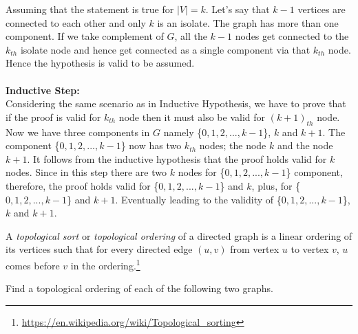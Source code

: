 \documentclass[addpoints]{exam}
\begin{document}
\begin{questions}
\begin{solution}
	Assuming that the statement is true for $\left|V\right|=k$. Let's say that $k-1$ vertices are connected to each other and only $k$ is an isolate. The graph has more than one component. If we take complement of $G$, all the $k-1$ nodes get connected to the $k_{th}$ isolate node and hence get connected as a single component via that $k_{th}$ node. Hence the hypothesis is valid to be assumed. \\ \\
	\textbf{Inductive Step:}\\
	Considering the same scenario as in Inductive Hypothesis, we have to prove that if the proof is valid for $k_{th}$ node then it must also be valid for $(k+1)_{th}$ node. Now we have three components in $G$ namely \{$0, 1, 2, ..., k-1$\}, $k$ and $k+1$. The component \{$0, 1, 2, ..., k-1$\} now has two $k_{th}$ nodes; the node $k$ and the node $k+1$. It follows from the inductive hypothesis that the proof holds valid for $k$ nodes. Since in this step there are two $k$ nodes for \{$0, 1, 2, ..., k-1$\} component, therefore, the proof holds valid for \{$0, 1, 2, ..., k-1$\} and $k$, plus, for \{$0, 1, 2, ..., k-1$\} and $k+1$. Eventually leading to the validity of \{$0, 1, 2, ..., k-1$\}, $k$ and $k+1$. 
  \end{solution}
\pagebreak


  A {\it topological sort} or {\it topological ordering} of a directed graph is a linear ordering of its vertices such that for every directed edge $(u,v)$ from vertex $u$ to vertex $v$, $u$ comes before $v$ in the ordering.\footnote{\url{https://en.wikipedia.org/wiki/Topological_sorting}}

  Find a topological ordering of each of the following two graphs.

  \begin{parts}

\end{parts}
\end{questions}
\end{document}
